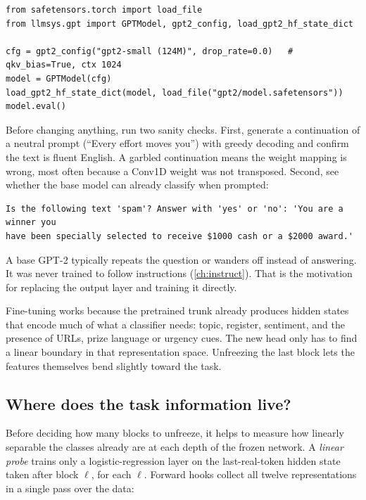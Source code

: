 \begin{lstlisting}[caption={Loading GPT-2 small for fine-tuning.},label={lst:classify:load}]
from safetensors.torch import load_file
from llmsys.gpt import GPTModel, gpt2_config, load_gpt2_hf_state_dict

cfg = gpt2_config("gpt2-small (124M)", drop_rate=0.0)   # qkv_bias=True, ctx 1024
model = GPTModel(cfg)
load_gpt2_hf_state_dict(model, load_file("gpt2/model.safetensors"))
model.eval()
\end{lstlisting}

Before changing anything, run two sanity checks. First, generate a continuation of
a neutral prompt (``Every effort moves you'') with greedy decoding and confirm the text
is fluent English. A garbled continuation means the weight mapping is wrong, most often
because a Conv1D weight was not transposed. Second, see whether the base model can
already classify when prompted:

\begin{lstlisting}[style=plain]
Is the following text 'spam'? Answer with 'yes' or 'no': 'You are a winner you
have been specially selected to receive $1000 cash or a $2000 award.'
\end{lstlisting}

A base GPT-2 typically repeats the question or wanders off instead of answering. It was
never trained to follow instructions (\cref{ch:instruct}). That is the motivation for
replacing the output layer and training it directly.

\begin{keyidea}
Fine-tuning works because the pretrained trunk already produces hidden states that
encode much of what a classifier needs: topic, register, sentiment, and the
presence of URLs, prize language or urgency cues. The new head only has to find a
linear boundary in that representation space. Unfreezing the last block lets the
features themselves bend slightly toward the task.
\end{keyidea}


\subsection{Where does the task information live?}\label{sec:classify:probe}

Before deciding how many blocks to unfreeze, it helps to measure how linearly
separable the classes already are at each depth of the frozen network. A \emph{linear
probe} trains only a logistic-regression layer on the last-real-token hidden state taken
after block $\ell$, for each $\ell$. Forward hooks collect all twelve representations
in a single pass over the data:

